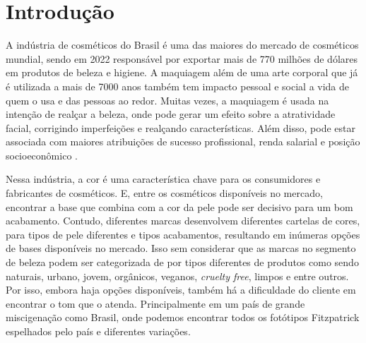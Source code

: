\chapter{Introdução}
\label{cap:introducao}

A indústria de cosméticos do Brasil é uma das maiores do mercado de cosméticos mundial, sendo em 2022 responsável por exportar mais de 770 milhões de dólares em produtos de beleza e higiene\cite{Cosmetics_industry_in_Brazil}. A maquiagem além de uma arte corporal que já é utilizada a mais de 7000 anos também tem impacto pessoal e social a vida de quem o usa e das pessoas ao redor. Muitas vezes, a maquiagem é usada na intenção de realçar a beleza, onde pode gerar um efeito sobre a atratividade facial, corrigindo imperfeições e realçando características. Além disso, pode estar associada com maiores atribuições de sucesso profissional, renda salarial e posição socioeconômico \cite{Respostas_Emocionais_Implícitas_Julgamento_da_Atratividade_Facial_em_Faces}.

 Nessa indústria, a cor é uma característica chave para os consumidores e  fabricantes de cosméticos. E, entre os cosméticos disponíveis no mercado, encontrar a base que combina com a cor da pele pode ser decisivo para um bom acabamento. Contudo, diferentes marcas desenvolvem diferentes cartelas de cores, para tipos de pele diferentes e tipos acabamentos, resultando em inúmeras opções de bases disponíveis no mercado. Isso sem considerar que as marcas no segmento de beleza podem ser categorizada de por tipos diferentes de produtos como sendo naturais, urbano, jovem, orgânicos, veganos, \textit{cruelty free}, limpos e entre outros. Por isso, embora haja opções disponíveis, também há a dificuldade do cliente em encontrar o tom que o atenda. Principalmente em um país de grande miscigenação como Brasil, onde podemos encontrar todos os fotótipos Fitzpatrick espelhados pelo país e diferentes variações.\cite{Régua_de_Pele_Linha_de_Maquiagem_para_a_Mulher_Brasileira}

